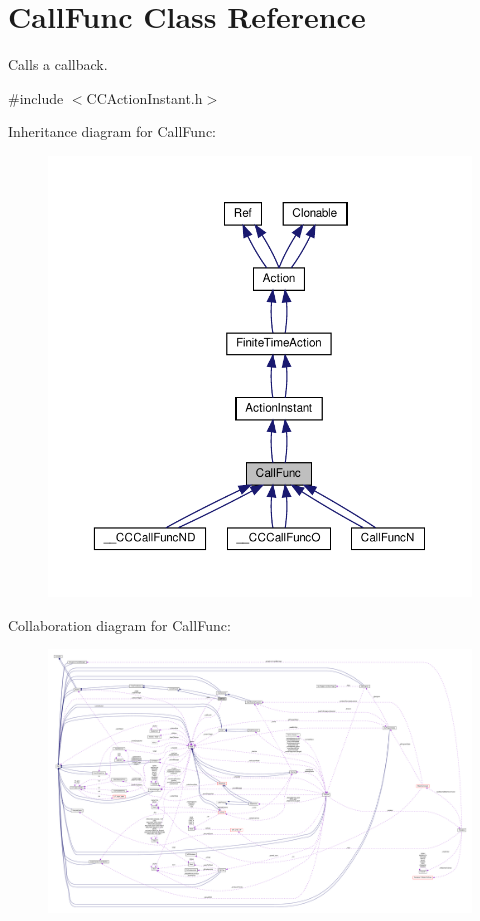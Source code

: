 \hypertarget{classCallFunc}{}\section{Call\+Func Class Reference}
\label{classCallFunc}


Calls a \textquotesingle{}callback\textquotesingle{}.  




{\ttfamily \#include $<$C\+C\+Action\+Instant.\+h$>$}



Inheritance diagram for Call\+Func\+:
\nopagebreak
\begin{figure}[H]
\begin{center}
\leavevmode
\includegraphics[width=350pt]{classCallFunc__inherit__graph}
\end{center}
\end{figure}


Collaboration diagram for Call\+Func\+:
\nopagebreak
\begin{figure}[H]
\begin{center}
\leavevmode
\includegraphics[width=350pt]{classCallFunc__coll__graph}
\end{center}
\end{figure}
